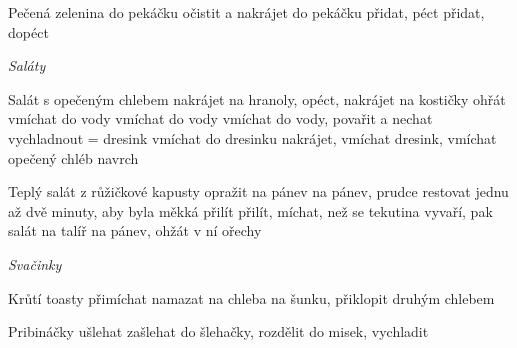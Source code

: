 \documentclass[12pt,a4paper]{article}
\begin{document}
\begin{recipe}{Pečená zelenina}
   do pekáčku
   očistit a nakrájet do pekáčku
   přidat, péct
   přidat, dopéct
\end{recipe}
\newpage

\vspace*{\fill}
\hfill {\Huge\it Saláty}\hfill
\vspace*{\fill}
\newpage

\begin{recipe}{Salát s opečeným chlebem}
   nakrájet na hranoly, opéct, nakrá\-jet na kostičky
   ohřát
   vmíchat do vody
   vmíchat do vody
   vmíchat do vody, povařit a nechat vychladnout = dresink
   vmíchat do dresinku
   nakrájet, vmíchat dresink, vmíchat ope\-če\-ný chléb
   navrch
\end{recipe}
\newpage

\begin{recipe}{Teplý salát z růžičkové kapusty}
   opražit
   na pánev
   na pánev, prudce restovat jednu až dvě minuty, aby byla měkká
   přilít
   přilít, míchat, než se tekutina vyvaří, pak salát na talíř
   na pánev, ohžát v ní ořechy
\end{recipe}
\newpage

\vspace*{\fill}
\hfill {\Huge\it Svačinky}\hfill
\vspace*{\fill}
\newpage

\begin{recipe}{Krůtí toasty}
   přimíchat
   namazat
   na chleba
   na šunku, přiklopit druhým chlebem
\end{recipe}
\newpage

\begin{recipe}{Pribináčky}
   ušlehat
   zašlehat do šlehačky, rozdělit do misek, vychladit
\end{recipe}
\newpage
\end{document}
